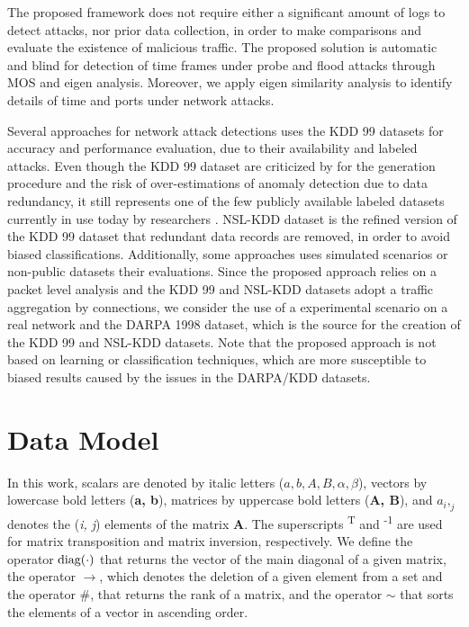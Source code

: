The proposed framework does not require either a significant amount of logs to detect attacks, nor prior data collection, in order to make comparisons and evaluate the existence of malicious traffic. The proposed solution is automatic and blind for detection of time frames under probe and flood attacks through MOS and eigen analysis. Moreover, we apply eigen similarity analysis to identify details of time and ports under network attacks.

Several approaches for network attack detections uses the KDD 99 \cite{ji2016multi,ahmed2016survey,osanaiye2016distributed,bhuyan2014network} datasets for accuracy and performance evaluation, due to their availability and labeled attacks. Even though the KDD 99 dataset are criticized by for the generation procedure and the risk of over-estimations of anomaly detection due to data redundancy, it still represents one of the few publicly available labeled datasets currently in use today by researchers \cite{osanaiye2016distributed,bhuyan2014network}. NSL-KDD \cite{tavallaee2009detailed} dataset is the refined version of the KDD 99 dataset that redundant data records are removed, in order to avoid biased classifications. Additionally, some approaches uses simulated \cite{callegari2011novel} scenarios or non-public datasets their evaluations. Since the proposed approach relies on a packet level analysis and the KDD 99 and NSL-KDD datasets adopt a traffic aggregation by connections, we consider the use of a experimental scenario on a real network and the DARPA 1998 dataset, which is the source for the creation of the KDD 99 and NSL-KDD datasets. Note that the proposed approach is not based on learning or classification techniques, which are more susceptible to biased results caused by the issues in the DARPA/KDD datasets.


\section{Data Model}
\label{sec:2_datamodel}

In this work, scalars are denoted by italic letters ($a, b, A, B, \alpha, \beta$), vectors by lowercase bold letters (\textbf{a, b}), matrices by uppercase bold letters (\textbf{A, B}), and $a_i,_j$ denotes the (\emph{i, j}) elements of the matrix \textbf{A}. The superscripts \textsuperscript{T} and \textsuperscript{-1} are used for matrix transposition and matrix inversion, respectively. We define the operator $\rm diag(\cdot)$ that returns the vector of the main diagonal of a given matrix, the operator $\rightarrow$, which denotes the deletion of a given element from a set and the operator $\#$, that returns the rank of a matrix, and the operator $\sim$ that sorts the elements of a vector in ascending order.

